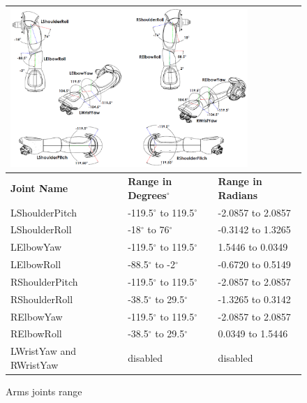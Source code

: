 \begin{figure}
\begin{tabular}{|p{5cm}|p{5cm}|p{5cm}|}
\multicolumn{3}{p{15cm}}{\centering \includegraphics[height = 6.0cm]{Figures/armsjoints.png}} \\ \hline
\textbf{Joint Name} & \textbf{Range in Degrees$^{\circ}$} & \textbf{Range in Radians} \\ \hline
LShoulderPitch & -119.5$^{\circ}$ to 119.5$^{\circ}$ & -2.0857 to 2.0857 \\ \hline
LShoulderRoll & -18$^{\circ}$ to 76$^{\circ}$ & -0.3142 to 1.3265 \\ \hline
LElbowYaw & -119.5$^{\circ}$ to 119.5$^{\circ}$ & 1.5446 to 0.0349 \\ \hline
LElbowRoll & -88.5$^{\circ}$ to -2$^{\circ}$ & -0.6720 to 0.5149 \\ \hline
RShoulderPitch & -119.5$^{\circ}$ to 119.5$^{\circ}$ & -2.0857 to 2.0857 \\ \hline
RShoulderRoll & -38.5$^{\circ}$ to 29.5$^{\circ}$ & -1.3265 to 0.3142 \\ \hline
RElbowYaw & -119.5$^{\circ}$ to 119.5$^{\circ}$ & -2.0857 to 2.0857 \\ \hline
RElbowRoll & -38.5$^{\circ}$ to 29.5$^{\circ}$ & 0.0349 to 1.5446 \\ \hline
LWristYaw and RWristYaw & disabled & disabled \\ \hline
\end{tabular}
\caption{Arms joints range}
\label{fig:ajoints}
\end{figure}

